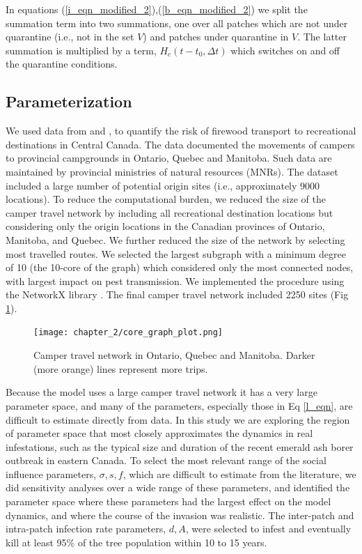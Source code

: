 In equations (\ref{i_eqn_modified_2}),(\ref{b_eqn_modified_2}) we split the summation term into two summations, one over all patches which are not under quarantine (i.e., not in the set $V$) and patches under quarantine in $V$. The latter summation is multiplied by a term, $H_c(t - t_0,\Delta t)$ which switches on and off the quarantine conditions.
\subsection{Parameterization \label{param_section}}
We used data from \cite{koch2014using} and \cite{yemshanov2015optimal}, to quantify the risk of firewood transport to recreational destinations in Central Canada. The data documented the movements of campers to provincial campgrounds in Ontario, Quebec and Manitoba. Such data are maintained by provincial ministries of natural resources (MNRs). The dataset included a large number of potential origin sites (i.e., approximately 9000 locations). To reduce the computational burden, we reduced the size of the camper travel network by including all recreational destination locations but considering only the origin locations in the Canadian provinces of Ontario, Manitoba, and Quebec. We further reduced the size of the network by selecting most travelled routes. We selected the largest subgraph with a minimum degree of 10 (the 10-core of the graph) which considered only the most connected nodes, with largest impact on pest transmission. We implemented the procedure using the NetworkX library \cite{hagberg2008exploring}. The final camper travel network included 2250 sites (Fig \ref{coregraph}).



\begin{figure}[!h]
\centering
\texttt{[image: chapter\_2/core\_graph\_plot.png]}
\caption[Camper travel network in Ontario, Quebec and Manitoba.]{Camper travel network in Ontario, Quebec and Manitoba. Darker (more orange) lines represent more trips.}
\label{coregraph}
\end{figure}


Because the model uses a large camper travel network it has a very large parameter space, and many of the parameters, especially those in Eq \ref{l_eqn}, are difficult to estimate directly from data. In this study we are exploring the region of parameter space that most closely approximates the dynamics in real infestations, such as the typical size and duration of the recent emerald ash borer outbreak in eastern Canada. To select the most relevant range of the social influence parameters, $\sigma, s, f$, which are difficult to estimate from the literature, we did sensitivity analyses over a wide range of these parameters, and identified the parameter space where these parameters had the largest effect on the model dynamics, and where the course of the invasion was realistic. The inter-patch and intra-patch infection rate parameters, $d, A$, were selected to infest and eventually kill at least 95\% of the tree population within 10 to 15 years.

